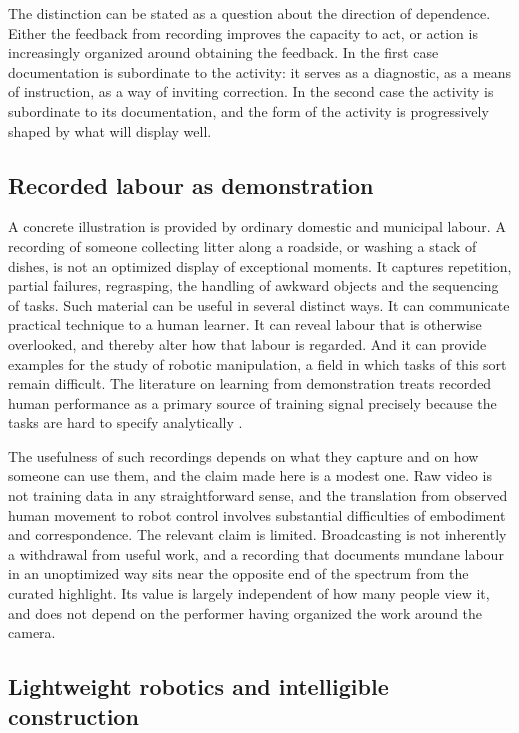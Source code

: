 \documentclass[11pt]{article}
\theoremstyle{definition}
\theoremstyle{remark}
\begin{document}
The distinction can be stated as a question about the direction of dependence. Either the feedback from recording improves the capacity to act, or action is increasingly organized around obtaining the feedback. In the first case documentation is subordinate to the activity: it serves as a diagnostic, as a means of instruction, as a way of inviting correction. In the second case the activity is subordinate to its documentation, and the form of the activity is progressively shaped by what will display well.

\subsection{Recorded labour as demonstration}

A concrete illustration is provided by ordinary domestic and municipal labour. A recording of someone collecting litter along a roadside, or washing a stack of dishes, is not an optimized display of exceptional moments. It captures repetition, partial failures, regrasping, the handling of awkward objects and the sequencing of tasks. Such material can be useful in several distinct ways. It can communicate practical technique to a human learner. It can reveal labour that is otherwise overlooked, and thereby alter how that labour is regarded. And it can provide examples for the study of robotic manipulation, a field in which tasks of this sort remain difficult. The literature on learning from demonstration treats recorded human performance as a primary source of training signal precisely because the tasks are hard to specify analytically \cite{argall2009}.

The usefulness of such recordings depends on what they capture and on how someone can use them, and the claim made here is a modest one. Raw video is not training data in any straightforward sense, and the translation from observed human movement to robot control involves substantial difficulties of embodiment and correspondence. The relevant claim is limited. Broadcasting is not inherently a withdrawal from useful work, and a recording that documents mundane labour in an unoptimized way sits near the opposite end of the spectrum from the curated highlight. Its value is largely independent of how many people view it, and does not depend on the performer having organized the work around the camera.

\subsection{Lightweight robotics and intelligible construction}
\end{document}
